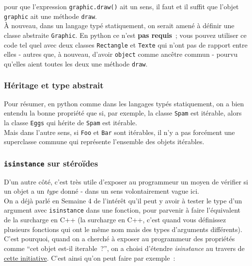 pour que l'expression \texttt{graphic.draw()} ait un sens, il faut et il
suffit que l'objet \texttt{graphic} ait une méthode \texttt{draw}.\\

    À nouveau, dans un langage typé statiquement, on serait amené à définir
une classe abstraite \texttt{Graphic}. En python ce n'est \textbf{pas
requis}~; vous pouvez utiliser ce code tel quel avec deux classes
\texttt{Rectangle} et \texttt{Texte} qui n'ont pas de rapport entre
elles - autres que, à nouveau, d'avoir \texttt{object} comme ancêtre
commun - pourvu qu'elles aient toutes les deux une méthode
\texttt{draw}.

    \hypertarget{huxe9ritage-et-type-abstrait}{%
\subsubsection{Héritage et type
abstrait}\label{huxe9ritage-et-type-abstrait}}

    Pour résumer, en python comme dans les langages typés statiquement, on a
bien entendu la bonne propriété que si, par exemple, la classe
\texttt{Spam} est itérable, alors la classe \texttt{Eggs} qui hérite de
\texttt{Spam} est itérable.\\

Mais dans l'autre sens, si \texttt{Foo} et \texttt{Bar} sont itérables,
il n'y a pas forcément une superclasse commune qui représente l'ensemble
des objets itérables.

    \hypertarget{isinstance-sur-stuxe9rouxefdes}{%
\subsubsection{\texorpdfstring{\texttt{isinstance} sur
stéroïdes}{isinstance sur stéroïdes}}\label{isinstance-sur-stuxe9rouxefdes}}

    D'un autre côté, c'est très utile d'exposer au programmeur un moyen de
vérifier si un objet a un \emph{type} donné - dans un sens
volontairement vague ici.\\

On a déjà parlé en Semaine 4 de l'intérêt qu'il peut y avoir à tester le
type d'un argument avec \texttt{isinstance} dans une fonction, pour
parvenir à faire l'équivalent de la surcharge en C++ (la surcharge en
C++, c'est quand vous définissez plusieurs fonctions qui ont le même nom
mais des types d'arguments différents).\\

C'est pourquoi, quand on a cherché à exposer au programmeur des
propriétés comme ``cet objet est-il iterable~?'', on a choisi d'étendre
\emph{isinstance} au travers de
\href{http://legacy.python.org/dev/peps/pep-3119/}{cette initiative}.
C'est ainsi qu'on peut faire par exemple~:

